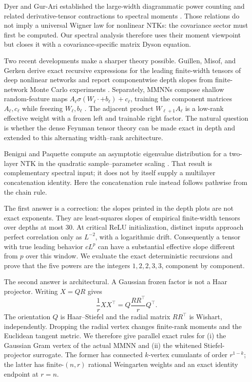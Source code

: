\documentclass{article}
\begin{document}
Dyer and Gur-Ari established the large-width diagrammatic power counting and
related derivative-tensor contractions to spectral moments
\citep{DyerGurAri2019}.  Those relations do not imply a universal Wigner law
for nonlinear NTKs: the covariance sector must first be computed.  Our
spectral analysis therefore uses their moment viewpoint but closes it with a
covariance-specific matrix Dyson equation.

Two recent developments make a sharper theory possible.  Guillen, Misof, and
Gerken derive exact recursive expressions for the leading finite-width
tensors of deep nonlinear networks and report componentwise depth slopes from
finite-network Monte Carlo experiments \citep{FeynmanNTK2026}.  Separately,
MMNNs compose shallow random-feature maps
\(A_\ell\sigma(W_\ell\cdot+b_\ell)+c_\ell\), training the component matrices
\(A_\ell,c_\ell\) while freezing \(W_\ell,b_\ell\) \citep{MMNN2024}.  The
adjacent product \(W_{\ell+1}A_\ell\) is a low-rank effective weight with a
frozen left and trainable right factor.  The natural question is whether the
dense Feynman tensor theory can be made exact in depth and extended to this
alternating width--rank architecture.

Benigni and Paquette compute an asymptotic eigenvalue distribution for a
two-layer NTK in the quadratic sample--parameter scaling
\citep{BenigniPaquette2025}.  That result is complementary spectral input; it
does not by itself supply a multilayer concatenation identity.  Here the
concatenation rule instead follows pathwise from the chain rule.

The first answer is a correction: the slopes printed in the depth plots are
not exact exponents.  They are least-squares slopes of empirical finite-width
tensors over depths at most \(30\).  At critical ReLU initialization, distinct
inputs approach perfect correlation only as \(L^{-2}\), with a logarithmic
drift.  Consequently a tensor with true leading behavior \(cL^p\) can have a
substantial effective slope different from \(p\) over this window.  We
evaluate the exact deterministic recursions and prove that the five powers
are the integers \(1,2,2,3,3\), component by component.

The second answer is architectural.  A Gaussian frozen factor is not a Haar
projector.  Writing \(X=QR\) gives
\[
\frac1rXX^\top=Q\frac{RR^\top}{r}Q^\top.
\]
The orientation \(Q\) is Haar--Stiefel and the radial matrix \(RR^\top\) is
Wishart, independently.  Dropping the radial vertex changes finite-rank
moments and the Euclidean tangent metric.  We therefore give parallel exact
rules for (i) the Gaussian Gram vertex of the actual MMNN and (ii) the
whitened Stiefel-projector surrogate.  The former has connected \(k\)-vertex
cumulants of order \(r^{1-k}\); the latter has finite-\((n,r)\) rational
Weingarten weights and an exact identity endpoint at \(r=n\).
\end{document}
